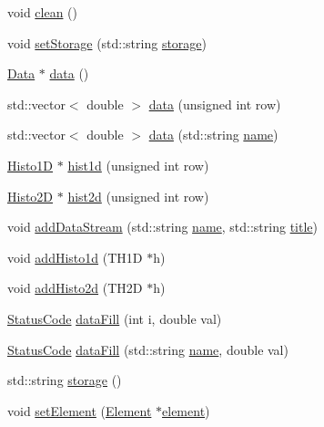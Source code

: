 \begin{DoxyCompactItemize}
void \hyperlink{classProcessus_aaeb17673b98d2b39f3aa780e335e0968}{clean} ()
\item 
void \hyperlink{classProcessus_ad57a29b33f9021eda9f6929136f1784f}{set\+Storage} (std\+::string \hyperlink{classProcessus_a33fa1a0b54a636e5cdd680669fd9ea51}{storage})
\item 
\hyperlink{classData}{Data} $\ast$ \hyperlink{classProcessus_a16e45f329fbce935aeef0ff3cb508228}{data} ()
\item 
std\+::vector$<$ double $>$ \hyperlink{classProcessus_aa7c57483cf4b9ab0b2d0ae2de8316402}{data} (unsigned int row)
\item 
std\+::vector$<$ double $>$ \hyperlink{classProcessus_abf4d91fb36707e1d50178bab12d21ae9}{data} (std\+::string \hyperlink{classObject_a300f4c05dd468c7bb8b3c968868443c1}{name})
\item 
\hyperlink{classHisto1D}{Histo1D} $\ast$ \hyperlink{classProcessus_a409227db936baff03c0462c1bcfe8069}{hist1d} (unsigned int row)
\item 
\hyperlink{classHisto2D}{Histo2D} $\ast$ \hyperlink{classProcessus_a73b5118cb5f2b5eaad33286183b86cfc}{hist2d} (unsigned int row)
\item 
void \hyperlink{classProcessus_a308c8f193802f1d1ab49d4447d0cb281}{add\+Data\+Stream} (std\+::string \hyperlink{classObject_a300f4c05dd468c7bb8b3c968868443c1}{name}, std\+::string \hyperlink{classObject_a73a0f1a41828fdd8303dd662446fb6c3}{title})
\item 
void \hyperlink{classProcessus_ad46e0d4dfdfdcbce001ee6be1746dfa4}{add\+Histo1d} (T\+H1D $\ast$h)
\item 
void \hyperlink{classProcessus_ac1ed1aed5edaeabdf18aa56775440471}{add\+Histo2d} (T\+H2D $\ast$h)
\item 
\hyperlink{classStatusCode}{Status\+Code} \hyperlink{classProcessus_a0d093b48f3218a088ba030e24372f18c}{data\+Fill} (int i, double val)
\item 
\hyperlink{classStatusCode}{Status\+Code} \hyperlink{classProcessus_aa31ab71711f7af6a729441ff573f69c9}{data\+Fill} (std\+::string \hyperlink{classObject_a300f4c05dd468c7bb8b3c968868443c1}{name}, double val)
\item 
std\+::string \hyperlink{classProcessus_a33fa1a0b54a636e5cdd680669fd9ea51}{storage} ()
\item 
void \hyperlink{classProcessus_a8ddef94227d83d9dae2cd49aebc33353}{set\+Element} (\hyperlink{classElement}{Element} $\ast$\hyperlink{classProcessus_a6fe155527431a7190b7d44d600b9608d}{element})
\item 

\end{DoxyCompactItemize}
